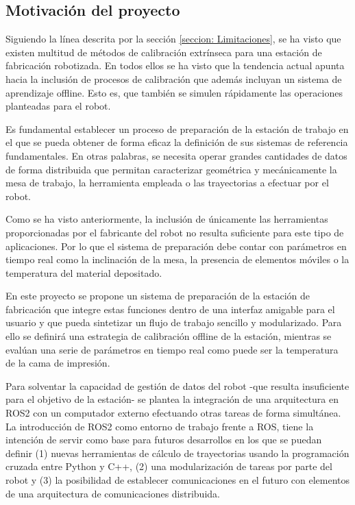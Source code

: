 \subsection{Motivación del proyecto}
Siguiendo la línea descrita por la sección \ref{seccion: Limitaciones}, se ha visto que existen multitud de métodos de calibración extrínseca para una estación de fabricación robotizada. En todos ellos se ha visto que la tendencia actual apunta hacia la inclusión de procesos de calibración que además incluyan un sistema de aprendizaje offline. Esto es, que también se simulen rápidamente las operaciones planteadas para el robot. 

Es fundamental establecer un proceso de preparación de la estación de trabajo en el que se pueda obtener de forma eficaz la definición de sus sistemas de referencia fundamentales. En otras palabras, se necesita operar grandes cantidades de datos de forma distribuida que permitan caracterizar geométrica y mecánicamente la mesa de trabajo, la herramienta empleada o las trayectorias a efectuar por el robot.

Como se ha visto anteriormente, la inclusión de únicamente las herramientas proporcionadas por el fabricante del robot no resulta suficiente para este tipo de aplicaciones. Por lo que el sistema de preparación debe contar con parámetros en tiempo real como la inclinación de la mesa, la presencia de elementos móviles o la temperatura del material depositado.

En este proyecto se propone un sistema de preparación de la estación de fabricación que integre estas funciones dentro de una interfaz amigable para el usuario y que pueda sintetizar un flujo de trabajo sencillo y modularizado. Para ello se definirá una estrategia de calibración offline de la estación, mientras se evalúan una serie de parámetros en tiempo real como puede ser la temperatura de la cama de impresión. 

Para solventar la capacidad de gestión de datos del robot -que resulta insuficiente para el objetivo de la estación- se plantea la integración de una arquitectura en \acrshort{ROS}2 con un computador externo efectuando otras tareas de forma simultánea. La introducción de ROS2 como entorno de trabajo frente a ROS, tiene la intención de servir como base para futuros desarrollos en los que se puedan definir (1) nuevas herramientas de cálculo de trayectorias usando la programación cruzada entre Python y C++, (2) una modularización de tareas por parte del robot y (3) la posibilidad de establecer comunicaciones en el futuro con elementos de una arquitectura de comunicaciones distribuida.

